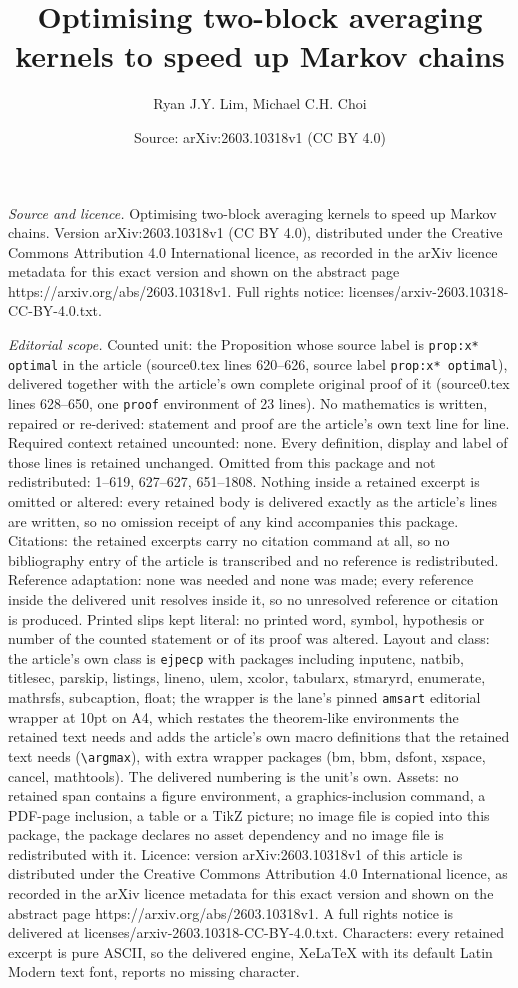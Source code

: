 \documentclass[10pt,a4paper]{amsart}
\title[Optimising two-block averaging kernels to speed up Markov ch]{Optimising two-block averaging kernels to speed up Markov chains}
\author{Ryan J.Y. Lim, Michael C.H. Choi}
\date{Source: arXiv:2603.10318v1 (CC BY 4.0)}
\begin{document}
\maketitle

\noindent\emph{Source and licence.} Optimising two-block averaging kernels to speed up Markov chains. Version arXiv:2603.10318v1 (CC BY 4.0), distributed under the Creative Commons Attribution 4.0 International licence, as recorded in the arXiv licence metadata for this exact version and shown on the abstract page https://arxiv.org/abs/2603.10318v1. Full rights notice: licenses/arxiv-2603.10318-CC-BY-4.0.txt.\par\smallskip

\noindent\textit{Editorial scope.} Counted unit: the Proposition whose source label is \texttt{prop:x* optimal} in the article (source0.tex lines 620--626, source label \texttt{prop:x* optimal}), delivered together with the article's own complete original proof of it (source0.tex lines 628--650, one \texttt{proof} environment of 23 lines). No mathematics is written, repaired or re-derived: statement and proof are the article's own text line for line. Required context retained uncounted: none. Every definition, display and label of those lines is retained unchanged. Omitted from this package and not redistributed: 1--619, 627--627, 651--1808. Nothing inside a retained excerpt is omitted or altered: every retained body is delivered exactly as the article's lines are written, so no omission receipt of any kind accompanies this package. Citations: the retained excerpts carry no citation command at all, so no bibliography entry of the article is transcribed and no reference is redistributed. Reference adaptation: none was needed and none was made; every reference inside the delivered unit resolves inside it, so no unresolved reference or citation is produced. Printed slips kept literal: no printed word, symbol, hypothesis or number of the counted statement or of its proof was altered. Layout and class: the article's own class is \texttt{ejpecp} with packages including inputenc, natbib, titlesec, parskip, listings, lineno, ulem, xcolor, tabularx, stmaryrd, enumerate, mathrsfs, subcaption, float; the wrapper is the lane's pinned \texttt{amsart} editorial wrapper at 10pt on A4, which restates the theorem-like environments the retained text needs and adds the article's own macro definitions that the retained text needs (\texttt{\textbackslash argmax}), with extra wrapper packages (bm, bbm, dsfont, xspace, cancel, mathtools). The delivered numbering is the unit's own. Assets: no retained span contains a figure environment, a graphics-inclusion command, a PDF-page inclusion, a table or a TikZ picture; no image file is copied into this package, the package declares no asset dependency and no image file is redistributed with it. Licence: version arXiv:2603.10318v1 of this article is distributed under the Creative Commons Attribution 4.0 International licence, as recorded in the arXiv licence metadata for this exact version and shown on the abstract page https://arxiv.org/abs/2603.10318v1. A full rights notice is delivered at licenses/arxiv-2603.10318-CC-BY-4.0.txt. Characters: every retained excerpt is pure ASCII, so the delivered engine, XeLaTeX with its default Latin Modern text font, reports no missing character.
\end{document}
